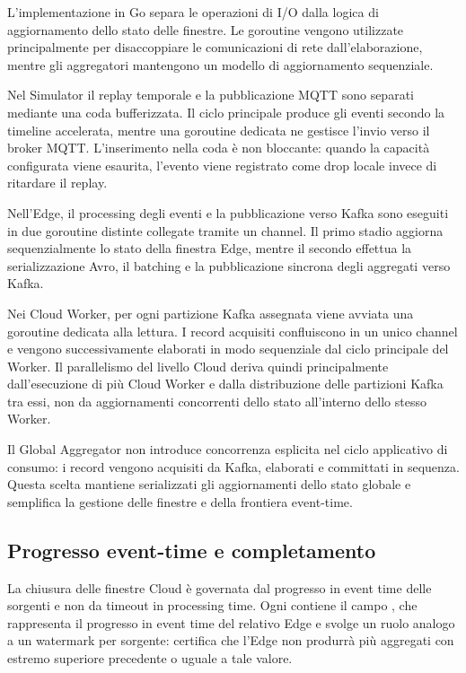 L'implementazione in Go separa le operazioni di I/O dalla logica di
aggiornamento dello stato delle finestre. Le goroutine vengono utilizzate
principalmente per disaccoppiare le comunicazioni di rete dall'elaborazione,
mentre gli aggregatori mantengono un modello di aggiornamento sequenziale.

Nel Simulator il replay temporale e la pubblicazione MQTT sono separati
mediante una coda bufferizzata. Il ciclo principale produce gli eventi
secondo la timeline accelerata, mentre una goroutine dedicata ne gestisce
l'invio verso il broker MQTT. L'inserimento nella coda è non bloccante:
quando la capacità configurata viene esaurita, l'evento viene registrato come
drop locale invece di ritardare il replay.

Nell'Edge, il processing degli eventi e la pubblicazione verso Kafka sono
eseguiti in due goroutine distinte collegate tramite un channel. Il primo
stadio aggiorna sequenzialmente lo stato della finestra Edge, mentre il
secondo effettua la serializzazione Avro, il batching e la pubblicazione
sincrona degli aggregati verso Kafka.

Nei Cloud Worker, per ogni partizione Kafka assegnata viene avviata una
goroutine dedicata alla lettura. I record acquisiti confluiscono in un unico
channel e vengono successivamente elaborati in modo sequenziale dal ciclo
principale del Worker. Il parallelismo del livello
Cloud deriva quindi principalmente dall'esecuzione di più Cloud Worker e
dalla distribuzione delle partizioni Kafka tra essi, non da aggiornamenti
concorrenti dello stato all'interno dello stesso Worker.

Il Global Aggregator non introduce concorrenza esplicita nel ciclo
applicativo di consumo: i record vengono acquisiti da Kafka, elaborati e
committati in sequenza. Questa scelta mantiene serializzati gli aggiornamenti
dello stato globale e semplifica la gestione delle finestre e della frontiera
event-time.

\subsection{Progresso event-time e completamento}

La chiusura delle finestre Cloud è governata dal progresso in event time
delle sorgenti e non da timeout in processing time. Ogni
 contiene il campo , che rappresenta
il progresso in event time del relativo Edge e svolge un ruolo analogo a un
watermark per sorgente: certifica che l'Edge non produrrà più aggregati con
estremo superiore precedente o uguale a tale valore.

